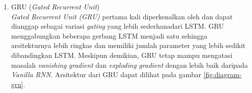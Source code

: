 \begin{enumerate}
\begin{enumerate}
    \item \textbf{\textit{Input Gate} (\(\mathbf{i}_t\))}:  
    Mengatur seberapa besar informasi baru yang akan disimpan ke dalam \(\mathbf{C}_t\).  
    \[
    \mathbf{i}_t = \sigma\bigl(W_i [\mathbf{h}_{t-1}, \mathbf{x}_t] + \mathbf{b}_i\bigr)
    \]

    \item \textbf{\textit{Candidate Cell State} (\(\tilde{\mathbf{C}}_t\))}:  
    Kandidat memori baru yang akan ditambahkan ke dalam \(\mathbf{C}_t\).  
    \[
    \tilde{\mathbf{C}}_t = \tanh\bigl(W_C [\mathbf{h}_{t-1}, \mathbf{x}_t] + \mathbf{b}_C\bigr)
    \]

    \item \textbf{\textit{Update Cell State}}:  
    Setelah memutuskan seberapa banyak informasi yang dibuang dan seberapa banyak yang ditambahkan  \(\mathbf{C}_t\) diupdate dengan:
    \[
    \mathbf{C}_t = \mathbf{f}_t \odot \mathbf{C}_{t-1} + \mathbf{i}_t \odot \tilde{\mathbf{C}}_t
    \]
    Di sini, \(\odot\) menandakan operasi perkalian \textit{elementwise}.

    \item \textbf{\textit{Output Gate} (\(\mathbf{o}_t\))}:
    Mengatur seberapa banyak informasi pada \(\mathbf{C}_t\) yang diambil untuk menghasilkan \(\mathbf{h}_t\).  
    \[
    \mathbf{o}_t = \sigma\bigl(W_o [\mathbf{h}_{t-1}, \mathbf{x}_t] + \mathbf{b}_o\bigr)
    \]

    \item \textbf{\textit{Hidden State} (\(\mathbf{h}_t\))}:  
    Nilai \(\mathbf{h}_t\) dihitung dengan “menyaring” \(\mathbf{C}_t\) melalui \(\tanh\) dan dikalikan dengan \(\mathbf{o}_t\):
    \[
    \mathbf{h}_t = \mathbf{o}_t \odot \tanh(\mathbf{C}_t)
    \]
\end{enumerate}

\item GRU (\textit{Gated Recurrent Unit}) \\
\textit{Gated Recurrent Unit (GRU)} pertama kali diperkenalkan oleh \textcite{cho2014learning} dan dapat dianggap sebagai variasi \textit{gating} yang lebih sederhanadari LSTM. GRU menggabungkan beberapa gerbang LSTM menjadi satu sehingga arsitekturnya lebih ringkas dan memiliki jumlah parameter yang lebih sedikit dibandingkan LSTM. Meskipun demikian, GRU tetap mampu mengatasi masalah \textit{vanishing gradient} dan \textit{exploding gradient} dengan lebih baik daripada \textit{Vanilla RNN}. Arsitektur dari GRU dapat dilihat pada gambar \ref{fig:diagram-gru}.


\end{enumerate}
